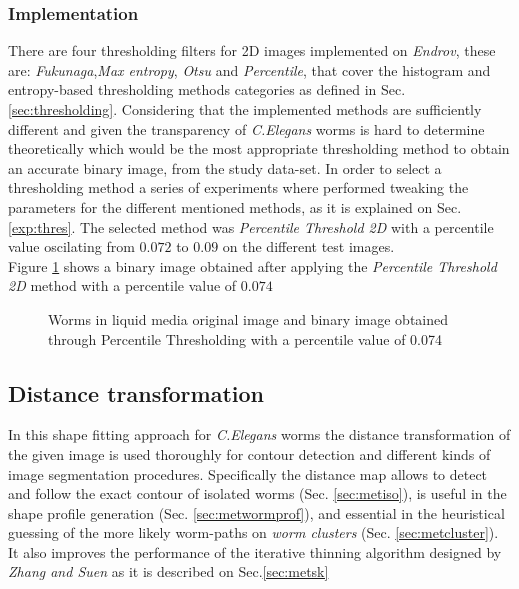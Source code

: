 \subsubsection{Implementation}
There are four thresholding filters for 2D images implemented on \emph{Endrov}, these are: 
\emph{Fukunaga},\emph{Max entropy}, \emph{Otsu} and \emph{Percentile}, that cover the 
histogram and entropy-based thresholding methods categories as defined in Sec.\ref{sec:thresholding}.
Considering that the implemented methods are sufficiently different and given the transparency
of \emph{C.Elegans} worms is hard to determine theoretically which would be the most appropriate 
thresholding method to obtain an accurate binary image, from the study data-set. In order 
to select a thresholding method a series of experiments where performed tweaking the parameters
for the different mentioned methods, as it is explained on Sec.\ref{exp:thres}.
The selected method was \emph{Percentile Threshold 2D} with a percentile value oscilating from
$0.072$ to $0.09$ on the different test images.\\

Figure \ref{fig:wormthres} shows a binary image obtained after applying
the \emph{Percentile Threshold 2D} method with a percentile value of $0.074$

\begin{figure}
  \centering
\qquad
\caption{Worms in liquid media original image and binary image obtained through
Percentile Thresholding with a percentile value of 0.074}
  \label{fig:wormthres}
\end{figure}

\subsection{Distance transformation}
\label{sec:metdt}

In this shape fitting approach for \emph{C.Elegans} worms the distance transformation
of the given image is used thoroughly for contour detection and different kinds of image 
segmentation procedures. Specifically the distance map allows to detect and follow
the exact contour of isolated worms (Sec. \ref{sec:metiso}), 
is useful in the shape profile generation (Sec. \ref{sec:metwormprof}), and essential in the heuristical
guessing of the more likely worm-paths on \emph{worm clusters} (Sec. \ref{sec:metcluster}).
It also improves the performance of the iterative thinning algorithm designed by 
\emph{Zhang and Suen} \cite{thinning} as it is described on Sec.\ref{sec:metsk}

